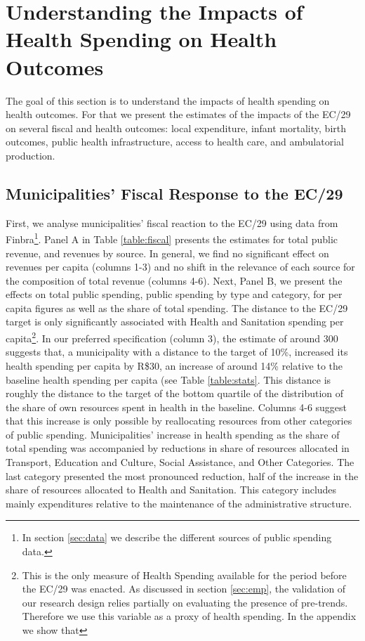 \section{Understanding the Impacts of Health Spending on Health Outcomes}\label{sec:results}

The goal of this section is to understand the impacts of health spending on health outcomes. For that we present the estimates of the impacts of the EC/29 on several fiscal and health outcomes: local expenditure, infant mortality, birth outcomes, public health infrastructure, access to health care, and ambulatorial production.

\subsection{Municipalities' Fiscal Response to the EC/29}

First, we analyse municipalities' fiscal reaction to the EC/29 using data from Finbra\footnote{In section \ref{sec:data} we describe the different sources of public spending data.}. Panel A in Table \ref{table:fiscal} presents the estimates for total public revenue, and revenues by source. In general, we find no significant effect on revenues per capita (columns 1-3) and no shift in the relevance of each source for the composition of total revenue (columns 4-6). Next, Panel B, we present the effects on total public spending, public spending by type and category, for per capita figures as well as the share of total spending. The distance to the EC/29 target is only significantly associated with Health and Sanitation spending per capita\footnote{This is the only measure of Health Spending available for the period before the EC/29 was enacted. As discussed in section \ref{sec:emp}, the validation of our research design relies partially on evaluating the presence of pre-trends. Therefore we use this variable as a proxy of health spending. In the appendix we show that }. In our preferred specification (column 3), the estimate of around 300 suggests that, a municipality with a distance to the target of 10\%, increased its health spending per capita by R\$30, an increase of around 14\% relative to the baseline health spending per capita (see Table \ref{table:stats}. This distance is roughly the distance to the target of the bottom quartile of the distribution of the share of own resources spent in health in the baseline. Columns 4-6 suggest that this increase is only possible by reallocating resources from other categories of public spending. Municipalities' increase in health spending as the share of total spending was accompanied by reductions in share of resources allocated in Transport, Education and Culture, Social Assistance, and Other Categories. The last category presented the most pronounced reduction, half of the increase in the share of resources allocated to Health and Sanitation. This category includes mainly expenditures relative to the maintenance of the administrative structure.

